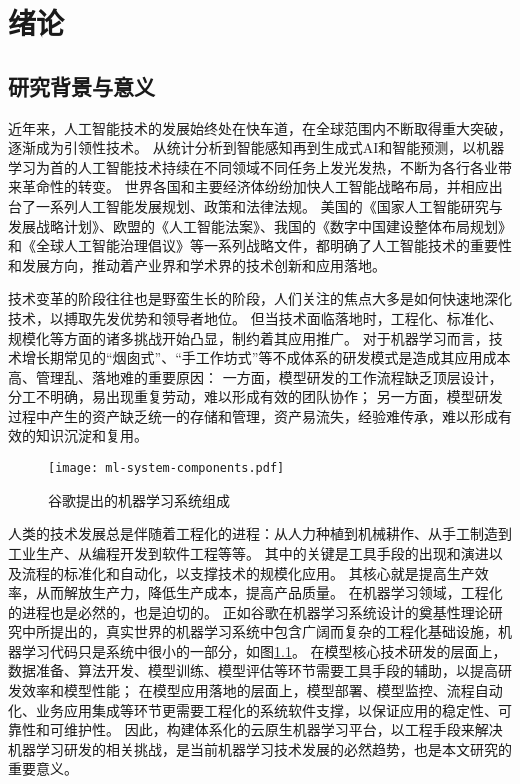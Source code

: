 
\chapter{绪论}


%
\section{研究背景与意义}

近年来，人工智能技术的发展始终处在快车道，在全球范围内不断取得重大突破，逐渐成为引领性技术。
从统计分析到智能感知再到生成式AI和智能预测，以机器学习为首的人工智能技术持续在不同领域不同任务上发光发热，不断为各行各业带来革命性的转变。
世界各国和主要经济体纷纷加快人工智能战略布局，并相应出台了一系列人工智能发展规划、政策和法律法规。
美国的《国家人工智能研究与发展战略计划》、欧盟的《人工智能法案》、我国的《数字中国建设整体布局规划》和《全球人工智能治理倡议》等一系列战略文件，都明确了人工智能技术的重要性和发展方向，推动着产业界和学术界的技术创新和应用落地。

技术变革的阶段往往也是野蛮生长的阶段，人们关注的焦点大多是如何快速地深化技术，以搏取先发优势和领导者地位。
但当技术面临落地时，工程化、标准化、规模化等方面的诸多挑战开始凸显，制约着其应用推广。
对于机器学习而言，技术增长期常见的“烟囱式”、“手工作坊式”等不成体系的研发模式是造成其应用成本高、管理乱、落地难的重要原因：
一方面，模型研发的工作流程缺乏顶层设计，分工不明确，易出现重复劳动，难以形成有效的团队协作；
另一方面，模型研发过程中产生的资产缺乏统一的存储和管理，资产易流失，经验难传承，难以形成有效的知识沉淀和复用。

\begin{figure}
  \centering
  \texttt{[image: ml-system-components.pdf]}
  \caption{谷歌提出的机器学习系统组成}
  \label{fig:mlcomponents}
\end{figure}

人类的技术发展总是伴随着工程化的进程：从人力种植到机械耕作、从手工制造到工业生产、从编程开发到软件工程等等。
其中的关键是工具手段的出现和演进以及流程的标准化和自动化，以支撑技术的规模化应用。
其核心就是提高生产效率，从而解放生产力，降低生产成本，提高产品质量。
在机器学习领域，工程化的进程也是必然的，也是迫切的。
正如谷歌在机器学习系统设计的奠基性理论研究中所提出的，真实世界的机器学习系统中包含广阔而复杂的工程化基础设施，机器学习代码只是系统中很小的一部分，如图\ref{fig:mlcomponents}。
在模型核心技术研发的层面上，数据准备、算法开发、模型训练、模型评估等环节需要工具手段的辅助，以提高研发效率和模型性能；
在模型应用落地的层面上，模型部署、模型监控、流程自动化、业务应用集成等环节更需要工程化的系统软件支撑，以保证应用的稳定性、可靠性和可维护性。
因此，构建体系化的云原生机器学习平台，以工程手段来解决机器学习研发的相关挑战，是当前机器学习技术发展的必然趋势，也是本文研究的重要意义。

